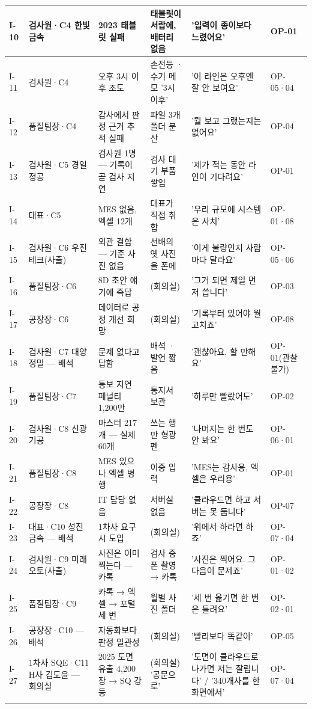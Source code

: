 \documentclass[10pt,a4paper]{article}
\begin{document}
{\begin{tabularx}{\linewidth}{|L{12mm}|L{30mm}|Y|L{44mm}|L{44mm}|L{44mm}|}
I-10 & 검사원·C4 한빛금속 & 2023 태블릿 실패 & 태블릿이 서랍에, 배터리 없음 & '입력이 종이보다 느렸어요' & OP-01 \\ \hline
I-11 & 검사원·C4 & 오후 3시 이후 조도 & 손전등 · 수기 메모 '3시 이후' & '이 라인은 오후엔 잘 안 보여요' & OP-05·04 \\ \hline
I-12 & 품질팀장·C4 & 감사에서 판정 근거 추적 실패 & 파일 3개 폴더 분산 & '뭘 보고 그랬는지는 없어요' & OP-04 \\ \hline
I-13 & 검사원·C5 경일정공 & 검사원 1명 — 기록이 곧 검사 지연 & 검사 대기 부품 쌓임 & '제가 적는 동안 라인이 기다려요' & OP-01 \\ \hline
I-14 & 대표·C5 & MES 없음, 엑셀 12개 & 대표가 직접 취합 & '우리 규모에 시스템은 사치' & OP-01·08 \\ \hline
I-15 & 검사원·C6 우진테크(사출) & 외관 결함 — 기준 사진 없음 & 선배의 옛 사진을 폰에 & '이게 불량인지 사람마다 달라요' & OP-05·06 \\ \hline
I-16 & 품질팀장·C6 & 8D 초안 얘기에 즉답 & (회의실) & '그거 되면 제일 먼저 씁니다' & OP-03 \\ \hline
I-17 & 공장장·C6 & 데이터로 공정 개선 희망 & (회의실) & '기록부터 있어야 뭘 고치죠' & OP-08 \\ \hline
I-18 & 검사원·C7 대양정밀 — 배석 & 문제 없다고 답함 & 배석 · 발언 짧음 & '괜찮아요, 할 만해요' & OP-01(관찰 불가) \\ \hline
I-19 & 품질팀장·C7 & 통보 지연 페널티 1,200만 & 통지서 보관 & '하루만 빨랐어도' & OP-02 \\ \hline
I-20 & 검사원·C8 신광기공 & 마스터 217개 — 실제 60개 & 쓰는 행만 형광펜 & '나머지는 한 번도 안 봐요' & OP-06·01 \\ \hline
I-21 & 품질팀장·C8 & MES 있으나 엑셀 병행 & 이중 입력 & 'MES는 감사용, 엑셀은 우리용' & OP-01 \\ \hline
I-22 & 공장장·C8 & IT 담당 없음 & 서버실 없음 & '클라우드면 하고 서버는 못 둡니다' & OP-07 \\ \hline
I-23 & 대표·C10 성진금속 — 배석 & 1차사 요구 시 도입 & (회의실) & '위에서 하라면 하죠' & OP-07·04 \\ \hline
I-24 & 검사원·C9 미래오토(사출) & 사진은 이미 찍는다 — 카톡 & 검사 중 폰 촬영 → 카톡 & '사진은 찍어요. 그다음이 문제죠' & OP-01·02 \\ \hline
I-25 & 품질팀장·C9 & 카톡 → 엑셀 → 포털 세 번 & 월별 사진 폴더 & '세 번 옮기면 한 번은 틀려요' & OP-02·01 \\ \hline
I-26 & 공장장·C10 — 배석 & 자동화보다 판정 일관성 & (회의실) & '빨리보다 똑같이' & OP-05 \\ \hline
I-27 & 1차사 SQE·C11 H사 김도윤 — 회의실 & 2025 도면 유출 4,200장 → SQ 강등 & (회의실) '공문으로' & '도면이 클라우드로 나가면 저는 잘립니다' / '340개사를 한 화면에서' & OP-07·04 \\ \hline
\fi
\end{tabularx}}
\landscapeoff
\end{document}
